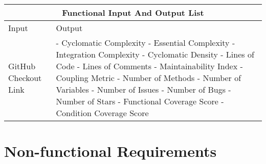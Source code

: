 \documentclass{article}
\begin{document}
\begin{tabular}{ |p{6cm}||p{6cm}| }
\hline
\multicolumn{2}{|c|}{Functional Input And Output List} \\
\hline
Input & Output \\
\hline 
GitHub Checkout Link & 
- Cyclomatic Complexity \newline
- Essential Complexity \newline
- Integration Complexity \newline
- Cyclomatic Density\newline
- Lines of Code \newline
- Lines of Comments\newline
- Maintainability Index\newline
- Coupling Metric \newline
- Number of Methods\newline
- Number of Variables\newline 
- Number of Issues\newline
- Number of Bugs\newline
- Number of Stars\newline
- Functional Coverage Score\newline
- Condition Coverage Score \\
\hline
\end{tabular}


\newpage
\section{Non-functional Requirements}
\end{document}
